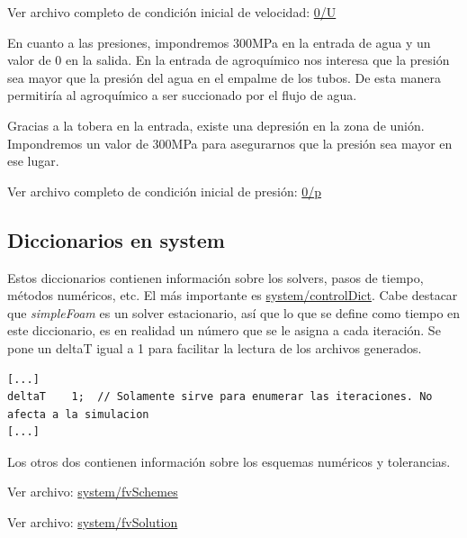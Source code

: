 \documentclass{article}
\begin{document}
Ver archivo completo de condición inicial de velocidad: \href{https://github.com/guillerolle/casos_cfd/blob/master/01/0/U}{0/U}

%
\bigskip
En cuanto a las presiones, impondremos 300MPa en la entrada de agua y un valor de 0 en la salida. En la entrada de agroquímico nos interesa que la presión sea mayor que la presión del agua en el empalme de los tubos. De esta manera permitiría al agroquímico a ser succionado por el flujo de agua.\par
Gracias a la tobera en la entrada, existe una depresión en la zona de unión. Impondremos un valor de 300MPa para asegurarnos que la presión sea mayor en ese lugar.

Ver archivo completo de condición inicial de presión: \href{https://github.com/guillerolle/casos_cfd/blob/master/01/0/p}{0/p}
%

\subsection{Diccionarios en system}
Estos diccionarios contienen información sobre los solvers, pasos de tiempo, métodos numéricos, etc.
El más importante es \href{https://github.com/guillerolle/casos_cfd/blob/master/01/system/controlDict}{system/controlDict}. Cabe destacar que \textit{simpleFoam} es un solver estacionario, así que lo que se define como tiempo en este diccionario, es en realidad un número que se le asigna a cada iteración. Se pone un deltaT igual a 1 para facilitar la lectura de los archivos generados.
\begin{lstlisting}
[...]
deltaT 	  1;  // Solamente sirve para enumerar las iteraciones. No afecta a la simulacion
[...]
\end{lstlisting}

Los otros dos contienen información sobre los esquemas numéricos y tolerancias.\par
Ver archivo: \href{https://github.com/guillerolle/casos_cfd/blob/master/01/system/fvSchemes}{system/fvSchemes}\par
Ver archivo:
\href{https://github.com/guillerolle/casos_cfd/blob/master/01/system/fvSolution}{system/fvSolution}
%
\end{document}
